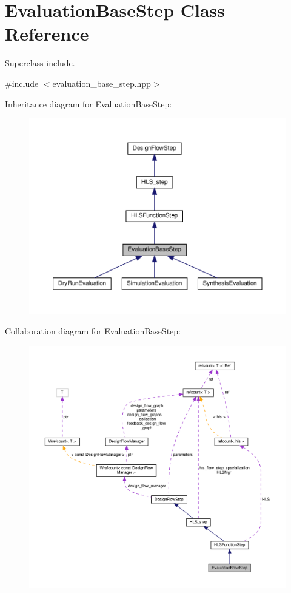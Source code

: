 \hypertarget{classEvaluationBaseStep}{}\section{Evaluation\+Base\+Step Class Reference}
\label{classEvaluationBaseStep}


Superclass include.  




{\ttfamily \#include $<$evaluation\+\_\+base\+\_\+step.\+hpp$>$}



Inheritance diagram for Evaluation\+Base\+Step\+:
\nopagebreak
\begin{figure}[H]
\begin{center}
\leavevmode
\includegraphics[width=350pt]{d3/d8a/classEvaluationBaseStep__inherit__graph}
\end{center}
\end{figure}


Collaboration diagram for Evaluation\+Base\+Step\+:
\nopagebreak
\begin{figure}[H]
\begin{center}
\leavevmode
\includegraphics[width=350pt]{d3/d0b/classEvaluationBaseStep__coll__graph}
\end{center}
\end{figure}
